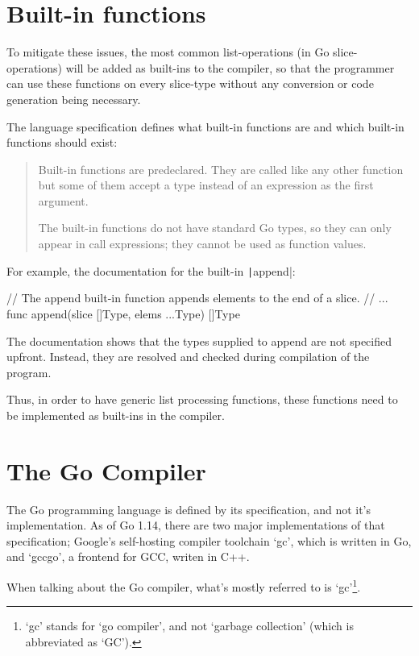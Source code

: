 \section{Built-in functions}

To mitigate these issues, the most common list-operations (in Go slice-operations) will
be added as built-ins to the compiler, so that the programmer can use these functions
on every slice-type without any conversion or code generation being necessary.

The language specification defines what built-in functions are and which built-in
functions should exist:
\begin{quote}
    Built-in functions are predeclared. They are called like any other function
    but some of them accept a type instead of an expression as the first argument.

    The built-in functions do not have standard Go types, so they can only appear
    in call expressions; they cannot be used as function values.\autocite{go-spec-builtins}
\end{quote}

For example, the documentation for the built-in \texttt|append|:
\begin{gocode}
// The append built-in function appends elements to the end of a slice.
// ...
func append(slice []Type, elems ...Type) []Type
\end{gocode}

The documentation shows that the types supplied to append are not specified upfront.
Instead, they are resolved and checked during compilation of the program.

Thus, in order to have generic list processing functions, these functions need to
be implemented as built-ins in the compiler.

\section{The Go Compiler}

The Go programming language is defined by its specification\autocite{go-spec}, and not
it's implementation. As of Go 1.14, there are two major implementations of that
specification; Google's self-hosting compiler toolchain `gc', which is written in
Go, and `gccgo', a frontend for GCC, writen in C++.

When talking about the Go compiler, what's mostly referred to is `gc'\footnote{`gc' stands
for `go compiler', and not `garbage collection' (which is abbreviated as `GC').}.

